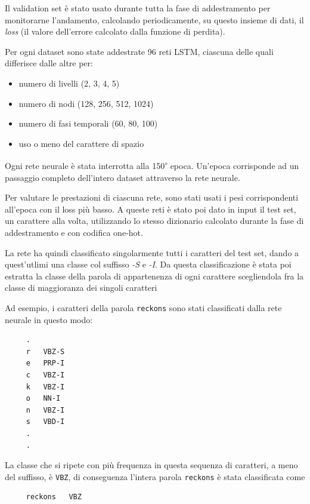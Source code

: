 Il validation set \`e stato usato durante tutta la fase di addestramento per monitorarne l'andamento, calcolando periodicamente, su questo insieme di dati, il \emph{loss} (il valore dell'errore calcolato dalla funzione di perdita).

Per ogni dataset sono state addestrate 96 reti LSTM, ciascuna delle quali differisce dalle altre per:

\begin{itemize}
  \item numero di livelli (2, 3, 4, 5)
  \item numero di nodi (128, 256, 512, 1024)
  \item numero di fasi temporali (60, 80, 100)
  \item uso o meno del carattere di spazio
\end{itemize}

Ogni rete neurale \`e stata interrotta alla 150\textsuperscript{$\circ$} epoca.
Un'epoca corrisponde ad un passaggio completo dell'intero dataset attraverso la rete neurale.

Per valutare le prestazioni di ciascuna rete, sono stati usati i pesi corrispondenti all'epoca con il loss pi\`u basso.
A queste reti \`e stato poi dato in input il test set, un carattere alla volta, utilizzando lo stesso dizionario calcolato durante la fase di addestramento e con codifica one-hot.

La rete ha quindi classificato singolarmente tutti i caratteri del test set, dando a quest'utlimi una classe col suffisso \emph{-S} e \emph{-I}.
Da questa classificazione \`e stata poi estratta la classe della parola di appartenenza di ogni carattere scegliendola fra la classe di maggioranza dei singoli caratteri

Ad esempio, i caratteri della parola \texttt{reckons} sono stati classificati dalla rete neurale in questo modo:

\begin{center}
  \begin{minipage}{5cm}
    \begin{verbatim}
     .
     r   VBZ-S
     e   PRP-I
     c   VBZ-I
     k   VBZ-I
     o   NN-I
     n   VBZ-I
     s   VBD-I
     .
     .
    \end{verbatim}
  \end{minipage}
\end{center}

La classe che si ripete con pi\`u frequenza in questa sequenza di caratteri, a meno del suffisso, \`e \texttt{VBZ}, di conseguenza l'intera parola \texttt{reckons} \`e stata classificata come

\begin{center}
  \begin{minipage}{5cm}
    \begin{verbatim}
     reckons   VBZ
    \end{verbatim}
  \end{minipage}
\end{center}
